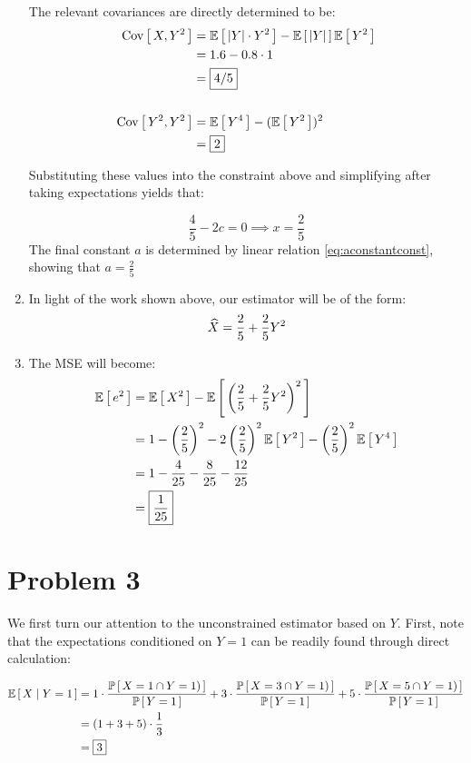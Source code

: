 \documentclass[12pt]{article}%
\begin{document}
\begin{enumerate}
  The relevant covariances are directly determined to be:
  \begin{align*}
      \text{Cov}\left[\,X,Y^2\,\right] & = \mathbb{E}\left[\,\abs{Y}\cdot Y^2\,\right] - \mathbb{E}\left[\,\abs{Y}\,\right]\mathbb{E}\left[\,Y^2\,\right] \\
      & = 1.6 - 0.8\cdot 1 \\
      & = \boxed{4/5}
      \\
      \\
      \text{Cov}\left[\,Y^2,Y^2\,\right] & = \mathbb{E}\left[\,Y^4\,\right] - (\mathbb{E}\left[\,Y^2\,\right])^2 \\
                     & = \boxed{2}
  \end{align*}

  Substituting these values into the constraint above and simplifying after taking expectations yields that:

  \[ \frac{4}{5} - 2c = 0 \implies \boxed{x = \frac{2}{5}} \]
  The final constant $a$ is determined by linear relation \ref{eq:aconstantconst}, showing that $a = \frac{2}{5}$

  \item In light of the work shown above, our estimator will be of the form:
  \[ \widehat{X} = \frac{2}{5} + \frac{2}{5}Y^2 \]

  \item
  The MSE will become:
  \begin{align*}
    \mathbb{E}\left[\,e^2\,\right] & = \mathbb{E}\left[\,X^2\,\right] - \mathbb{E}\left[\,\left(\frac{2}{5} + \frac{2}{5}Y^2\right)^2\,\right] \\
    & = 1 - \left(\frac{2}{5}\right)^2 - 2\left(\frac{2}{5}\right)^2 \mathbb{E}\left[\,Y^2\,\right] - \left(\frac{2}{5}\right)^2 \mathbb{E}\left[\,Y^4\,\right] \\
    & = 1 - \frac{4}{25} - \frac{8}{25} - \frac{12}{25}\\
    & = \boxed{\frac{1}{25}}
  \end{align*}
\end{enumerate}

\section{Problem 3}
We first turn our attention to the unconstrained estimator based on $Y$. First, note that the expectations conditioned on $Y=1$ can be readily found through direct calculation:

\begin{align*}
  \mathbb{E}\left[\,{X}\mid {Y = 1}\,\right] & = 1\cdot \frac{\mathbb{P}\left[\,X = 1 \cap Y = 1)\,\right]}{\mathbb{P}\left[\,Y = 1\,\right]} + 3 \cdot \frac{\mathbb{P}\left[\,X = 3 \cap Y = 1)\,\right]}{\mathbb{P}\left[\,Y = 1\,\right]} + 5 \cdot \frac{\mathbb{P}\left[\,X = 5 \cap Y = 1)\,\right]}{\mathbb{P}\left[\,Y = 1\,\right]} \\
  & = (1 + 3 + 5) \cdot \frac{1}{3} \\
  & = \boxed{3}
\end{align*}
\end{document}
